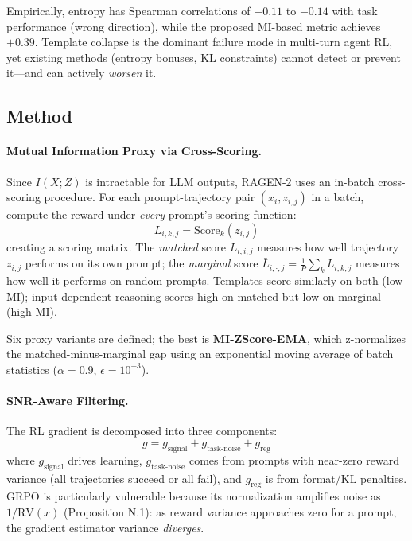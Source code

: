 \documentclass[11pt]{article}
\begin{document}
Empirically, entropy has Spearman correlations of $-0.11$ to $-0.14$ with task performance (wrong direction), while the proposed MI-based metric achieves $+0.39$. Template collapse is the dominant failure mode in multi-turn agent RL, yet existing methods (entropy bonuses, KL constraints) cannot detect or prevent it---and can actively \textit{worsen} it.

\subsection{Method}

\paragraph{Mutual Information Proxy via Cross-Scoring.}
Since $I(X;Z)$ is intractable for LLM outputs, RAGEN-2 uses an in-batch cross-scoring procedure. For each prompt-trajectory pair $(x_i, z_{i,j})$ in a batch, compute the reward under \textit{every} prompt's scoring function:
\begin{equation}
    L_{i,k,j} = \mathrm{Score}_k(z_{i,j})
\end{equation}
creating a scoring matrix. The \textit{matched} score $L_{i,i,j}$ measures how well trajectory $z_{i,j}$ performs on its own prompt; the \textit{marginal} score $\bar{L}_{i,\cdot,j} = \frac{1}{P}\sum_k L_{i,k,j}$ measures how well it performs on random prompts. Templates score similarly on both (low MI); input-dependent reasoning scores high on matched but low on marginal (high MI).

Six proxy variants are defined; the best is \textbf{MI-ZScore-EMA}, which z-normalizes the matched-minus-marginal gap using an exponential moving average of batch statistics ($\alpha = 0.9$, $\epsilon = 10^{-3}$).

\paragraph{SNR-Aware Filtering.}
The RL gradient is decomposed into three components:
\begin{equation}
    g = g_{\mathrm{signal}} + g_{\mathrm{task\text{-}noise}} + g_{\mathrm{reg}}
\end{equation}
where $g_{\mathrm{signal}}$ drives learning, $g_{\mathrm{task\text{-}noise}}$ comes from prompts with near-zero reward variance (all trajectories succeed or all fail), and $g_{\mathrm{reg}}$ is from format/KL penalties. GRPO is particularly vulnerable because its normalization amplifies noise as $1/\mathrm{RV}(x)$ (Proposition N.1): as reward variance approaches zero for a prompt, the gradient estimator variance \textit{diverges}.
\end{document}
